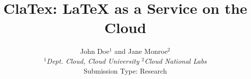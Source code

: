 \documentclass[10pt,twocolumn]{article}
\begin{document}
\title{ClaTex: LaTeX as a Service on the Cloud}
\author{John Doe$^1$ and Jane Monroe$^2$ \\
\small {\em  $^1$Dept. Cloud, Cloud University \quad
          $^2$Cloud National Labs} \\ [2mm]
\small Submission Type: Research
}
\date{}
\maketitle












\end{document}
